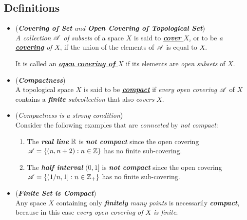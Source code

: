 \documentclass[11pt]{article}
\begin{document}
\subsection{Definitions}
\begin{itemize}
\item \begin{definition} (\emph{\textbf{Covering of Set} and \textbf{Open Covering of Topological Set}})\\
\emph{A collection ${\mathscr A}$ of subsets} of a space $X$ is said to \underline{\emph{\textbf{cover}} $X$,} or to be \emph{a \underline{\textbf{covering}} of $X$}, if the union of the elements of ${\mathscr A}$ is equal to $X$. 

It is called an \underline{\emph{\textbf{open covering of $X$}}} if its elements are \emph{open subsets} of $X$.
\end{definition}

\item \begin{definition} (\emph{\textbf{Compactness}})\\
A topological space $X$ is said to be \underline{\emph{\textbf{compact}}} if \emph{every open covering} ${\mathscr A}$ of $X$ contains a \emph{\textbf{finite} subcollection} that also \emph{covers} $X$.
\end{definition}


\item \begin{example}(\emph{Compactness is a strong condition})\\
Consider the following examples that are \emph{connected} by \emph{not compact}:
\begin{enumerate}
\item The \emph{\textbf{real line}} ${\mathbb R}$ is \textit{\textbf{not compact}} since the open covering ${\mathscr A} = \left\{(n, n+2): n \in {\mathbb Z}\right\}$ has no finite sub-covering.
\item The \emph{\textbf{half interval}} $(0, 1]$ is \emph{\textbf{not compact}} since the open covering ${\mathscr A} = \left\{(1/n, 1]: n \in {\mathbb Z}_{+}\right\}$ has no finite sub-covering.
\end{enumerate}
\end{example}

\item \begin{example}(\emph{\textbf{Finite Set is Compact}})\\
Any space $X$ containing only \emph{\textbf{finitely} many points} is necessarily \emph{\textbf{compact}}, because in this case \emph{every open covering of $X$ is finite}.
\end{example}


\end{itemize}
\end{document}
